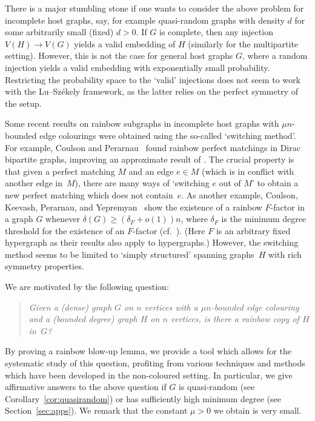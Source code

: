 \documentclass[10pt]{amsart}
\theoremstyle{definition}
\theoremstyle{claimstyle}
\theoremstyle{stepstyle}
\numberwithin{equation}{section}
\begin{document}
There is a major stumbling stone if one wants to consider the above problem for incomplete host graphs,
say, for example quasi-random graphs with density $d$ for some arbitrarily small (fixed) $d>0$.
If $G$ is complete, then any injection $V(H)\to V(G)$ yields a valid embedding of $H$ (similarly for the multipartite setting). However, this is not the case for general host graphs $G$, where a random injection yields a valid embedding with exponentially small probability. Restricting the probability space to the `valid' injections does not seem to work with the Lu--Sz\'ekely framework, as the latter relies on the perfect symmetry of the setup. 

Some recent results on rainbow subgraphs in incomplete host graphs with $\mu n$-bounded edge colourings were obtained using the so-called `switching method'. 
For example, Coulson and Perarnau~\cite{CP:17} found rainbow perfect matchings in Dirac bipartite graphs, improving an approximate result of \cite{CPS:17}. The crucial property is that given a perfect matching $M$ and an edge $e\in M$ (which is in conflict with another edge in~$M$), there are many ways of `switching $e$ out of $M$' to obtain a new perfect matching which does not contain~$e$.
As another example, Coulson, Keevash, Perarnau, and Yepremyan~\cite{CKPY:18} show the existence of a rainbow $F$-factor in a graph $G$ 
whenever $\delta(G)\geq (\delta_F+o(1))n$, where $\delta_F$ is the minimum degree threshold for the existence of an $F$-factor (cf.~\cite{KO:09}). 
(Here $F$ is an arbitrary fixed hypergraph as their results also apply to hypergraphs.)
However, the switching method seems to be limited to `simply structured' spanning graphs~$H$ with rich symmetry properties.

We are motivated by the following question:
\begin{quote}
\emph{Given a (dense) graph $G$ on $n$ vertices with a $\mu n$-bounded edge colouring and a (bounded degree) graph $H$ on $n$ vertices, is there a rainbow copy of $H$ in~$G$?}
\end{quote}
By proving a rainbow blow-up lemma, we provide a tool which allows for the systematic study of this question,
profiting from various techniques and methods which have been developed in the non-coloured setting.
In particular, we give affirmative answers to the above question if $G$ is quasi-random (see Corollary~\ref{cor:quasirandom}) or has sufficiently high minimum degree (see Section~\ref{sec:apps}).
We remark that the constant $\mu>0$ we obtain is very small.
\end{document}
